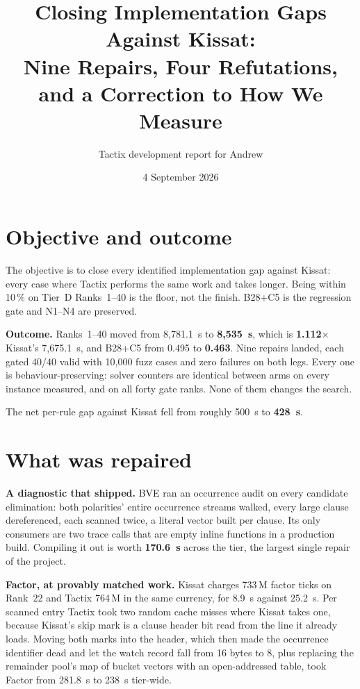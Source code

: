 \documentclass[11pt]{article}
\title{Closing Implementation Gaps Against Kissat:\\
Nine Repairs, Four Refutations, and a Correction to How We Measure}
\author{Tactix development report for Andrew}
\date{4 September 2026}
\begin{document}
\maketitle

\section{Objective and outcome}

The objective is to close every identified implementation gap against Kissat:
every case where Tactix performs the same work and takes longer. Being within
10\,\% on Tier~D Ranks~1--40 is the floor, not the finish. B28+C5 is the
regression gate and N1--N4 are preserved.

\textbf{Outcome.} Ranks~1--40 moved from 8{,}781.1~s to \textbf{8{,}535~s},
which is \textbf{1.112$\times$} Kissat's 7{,}675.1~s, and B28+C5 from 0.495 to
\textbf{0.463}. Nine repairs landed, each gated 40/40 valid with 10{,}000 fuzz
cases and zero failures on both legs. Every one is behaviour-preserving: solver
counters are identical between arms on every instance measured, and on all
forty gate ranks. None of them changes the search.

The net per-rule gap against Kissat fell from roughly 500~s to \textbf{428~s}.

\section{What was repaired}

\textbf{A diagnostic that shipped.} BVE ran an occurrence audit on every
candidate elimination: both polarities' entire occurrence streams walked, every
large clause dereferenced, each scanned twice, a literal vector built per
clause. Its only consumers are two trace calls that are empty inline functions
in a production build. Compiling it out is worth \textbf{170.6~s} across the
tier, the largest single repair of the project.

\textbf{Factor, at provably matched work.} Kissat charges 733\,M factor ticks on
Rank~22 and Tactix 764\,M in the same currency, for 8.9~s against 25.2~s. Per
scanned entry Tactix took two random cache misses where Kissat takes one,
because Kissat's skip mark is a clause header bit read from the line it already
loads. Moving both marks into the header, which then made the occurrence
identifier dead and let the watch record fall from 16 bytes to 8, plus replacing
the remainder pool's map of bucket vectors with an open-addressed table, took
Factor from 281.8~s to 238~s tier-wide.
\end{document}
